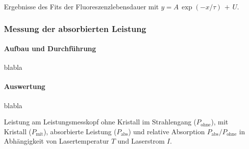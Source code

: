 \begin{table}[htb]
\caption{Ergebnisse des Fits der Fluoreszenzlebensdauer mit
$y=A\,\exp(-x/\tau)\,+\,U$.}

\label{tab:Fit_lifetime}
\end{table}


\subsubsection{Messung der absorbierten Leistung}

\paragraph{Aufbau und Durchführung}
blabla

\paragraph{Auswertung}
blabla
 
\begin{table}[htb]
\caption{Leistung am Leistungsmesskopf ohne Kristall im Strahlengang ($P_\text{ohne}$),
mit Kristall ($P_\text{mit}$), absorbierte Leistung ($P_\text{abs}$) und relative Absorption
$P_\text{abs}/P_\text{ohne}$ in Abhängigkeit von Lasertemperatur $T$ und Laserstrom $I$.}

\label{tab:Absorption}
\end{table}
